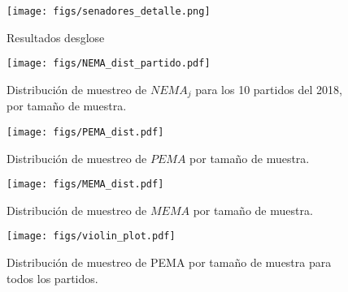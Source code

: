 \documentclass[]{article}
\begin{document}
\begin{figure}[!htpb]
  \centering
      \texttt{[image: figs/senadores\_detalle.png]}
      \caption{Resultados desglose}
      \label{fig:resultados2018}
\end{figure}

\begin{figure}[!htpb]
  \centering
      \texttt{[image: figs/NEMA\_dist\_partido.pdf]}
  \caption{Distribución de muestreo de $NEMA_j$ para los 10 partidos del 2018, por tamaño de muestra.}
  \label{fig:nemaj}
\end{figure}


\begin{figure}[!htpb]
  \centering
      \texttt{[image: figs/PEMA\_dist.pdf]}
      \caption{Distribución de muestreo de $PEMA$ por tamaño de muestra.}
      \label{fig:pema}
\end{figure}

\begin{figure}[!htpb]
  \centering
      \texttt{[image: figs/MEMA\_dist.pdf]}
      \caption{Distribución de muestreo de $MEMA$ por tamaño de muestra.}
      \label{fig:mema}
\end{figure}

\begin{figure}[!htpb]
  \centering
      \texttt{[image: figs/violin\_plot.pdf]}
      \caption{Distribución de muestreo de PEMA por tamaño de muestra para todos los partidos.}
      \label{fig:pemall}
\end{figure}

\end{document}
